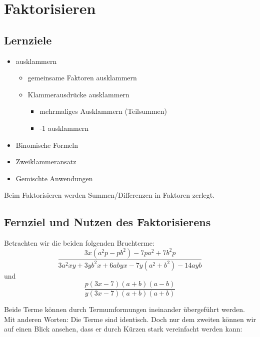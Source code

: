 \newpage
\section{Faktorisieren}

\subsection*{Lernziele}

\begin{itemize}
\item ausklammern
 \begin{itemize}
  \item gemeinsame Faktoren ausklammern
  \item Klammerausdrücke ausklammern
   \begin{itemize}
   \item mehrmaliges Ausklammern (Teilsummen)
  \item -1 ausklammern
  \end{itemize}
\end{itemize}
\item Binomische Formeln
\item Zweiklammeransatz
\item Gemischte Anwendungen
\end{itemize}


\newpage


Beim Faktorisieren werden Summen/Differenzen in Faktoren
zerlegt.


\subsection*{Fernziel und Nutzen des Faktorisierens}
Betrachten wir die beiden folgenden Bruchterme:
 $$\frac{3x(a^2p - pb^2) - 7pa^2 + 7b^2p}{3a^2xy  + 3yb^2x + 6abyx - 7y(a^2 +b^2) - 14ayb }$$
und
$$\frac{p(3x-7)(a+b)(a-b)}{y(3x-7)(a+b)(a+b)}$$

Beide Terme können durch Termumformungen ineinander übergeführt werden. Mit anderen Worten: Die Terme sind identisch. Doch nur dem zweiten können wir auf einen Blick ansehen, dass er durch Kürzen stark vereinfacht werden kann:

